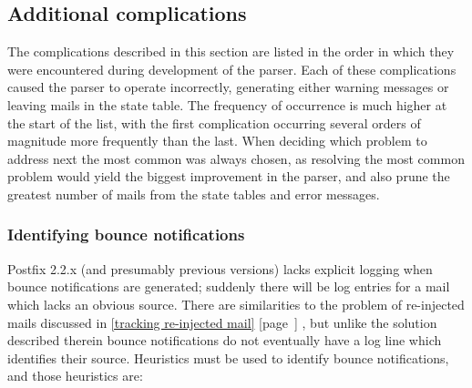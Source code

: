 \documentclass[a4paper,12pt,draft]{article}
\newcommand{\refwithpage}[1]{%
    \empty{}\ref{#1} [page~\pageref{#1}]%
}
\newcommand{\sectionref}[1]{%
    \textsection{}\refwithpage{#1}%
}
\begin{document}
\subsection{Additional complications}

\label{additional complications}

The complications described in this section are listed in the order in
which they were encountered during development of the parser.  Each of
these complications caused the parser to operate incorrectly, generating
either warning messages or leaving mails in the state table.  The frequency
of occurrence is much higher at the start of the list, with the first
complication occurring several orders of magnitude more frequently than the
last.  When deciding which problem to address next the most common was
always chosen, as resolving the most common problem would yield the biggest
improvement in the parser, and also prune the greatest number of mails from
the state tables and error messages.


\subsubsection{Identifying bounce notifications}

\label{identifying-bounce-notifications}

Postfix 2.2.x (and presumably previous versions) lacks explicit logging
when bounce notifications are generated; suddenly there will be log entries
for a mail which lacks an obvious source.  There are similarities to the
problem of re-injected mails discussed in \sectionref{tracking re-injected
mail}, but unlike the solution described therein bounce notifications do
not eventually have a log line which identifies their source.  Heuristics
must be used to identify bounce notifications, and those heuristics are:
\end{document}
